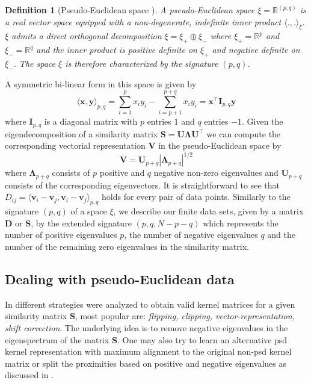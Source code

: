 \documentclass[twoside,11pt]{article}
\renewcommand{\v}[1]{\mathbf{#1}}
\newtheorem{definition}[theorem]{Definition}
\begin{document}
\begin{definition}[Pseudo-Euclidean space \cite{Pekalska2005a}]
A pseudo-Euclidean space $\xi=\mathbb{R}^{(p,q)}$
is a real vector space equipped with a non-degenerate,
indefinite inner product $\langle .,.\rangle_\xi$. $\xi$ admits a direct orthogonal decomposition $\xi=\xi_+  \oplus \xi_-$ where
$\xi_+= \mathbb{R}^p$ and $\xi_-= \mathbb{R}^q$ and the inner product is positive definite on $\xi_+$ and negative
definite on $\xi_-$. The space $\xi$ is therefore characterized by the signature $(p,q)$.
\end{definition}

A symmetric bi-linear form in this space is given by 
\[
\langle\v{x},\v{y}\rangle_{p,q} =
\sum_{i=1}^p x_i y_i - \sum_{i=p+1}^{p+q} x_i y_i =
\v{x}^\top \mathbf{I}_{p,q}\v{y}
\]
where $\mathbf{I}_{p,q}$ is a diagonal matrix with $p$ entries $1$ and $q$ entries $-1$.
Given the eigendecomposition of a similarity matrix
$\mathbf{S} = \mathbf{U} \mathbf{\Lambda} \mathbf{U}^\top$
we can compute the corresponding vectorial representation $\mathbf{V}$
in the pseudo-Euclidean space by
\begin{equation}
\mathbf{V} = \mathbf{U}_{p+q} \left|\mathbf{\Lambda}_{p+q}\right|^{1/2}
\label{eq:embedding}
\end{equation}
where $\mathbf{\Lambda}_{p+q}$ consists of $p$ positive and $q$ negative
non-zero eigenvalues and $\mathbf{U}_{p+q}$ consists of the corresponding eigenvectors.
It is straightforward to see that
$D_{ij}=\langle\v{v}_i-\v{v}_j,\v{v}_i-\v{v}_j\rangle_{p,q}$
holds for every pair of data points.
Similarly to the signature $(p, q)$ of a space $\xi$,
we describe our finite data sets, given by a matrix $\mathbf{D}$ or $\mathbf{S}$,
by the extended signature $(p, q, N-p-q)$
which represents the number of positive eigenvalues $p$,
the number of negative eigenvalues $q$
and the number of the remaining zero eigenvalues
in the similarity matrix.

\subsection{Dealing with pseudo-Euclidean data}
\label{sec:trafos_corr}
In \cite{DBLP:journals/jmlr/ChenGGRC09} different strategies were analyzed to
obtain valid kernel matrices for a given similarity matrix $\mathbf{S}$,
most popular are: \emph{flipping, clipping, vector-representation, shift correction}.
The underlying idea is to remove negative eigenvalues
in the eigenspectrum of the matrix $\mathbf{S}$.
One may also try to learn an alternative psd kernel representation with maximum alignment to the original non-psd kernel matrix \cite{DBLP:journals/jmlr/ChenGGRC09,DBLP:conf/icml/ChenGR09,DBLP:journals/jmlr/LiZY09}
or split the proximities based on positive and negative eigenvalues as discussed in
\cite{Pekalska2005a,Haasdonk2009a}.
\end{document}
